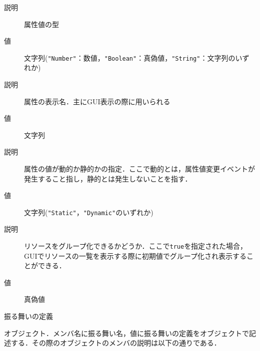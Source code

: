 \begin{description}
\begin{description}
            \begin{description}
            \setlength{\itemsep}{-1.5\itemsep}
            {\nopagebreak
            \item[\texttt{VariableType}] \mbox{}
            \vspace{-0.25zw}
                \begin{description}
                \item[説明] 属性値の型
                \item[値] 文字列(\verb|"Number"|：数値，\verb|"Boolean"|：真偽値，\verb|"String"|：文字列のいずれか)
                \end{description}
            }{\nopagebreak
            \item[\texttt{DisplayName}] \mbox{}
            \vspace{-0.25zw}
                \begin{description}
                \item[説明] 属性の表示名．主にGUI表示の際に用いられる
                \item[値] 文字列
                \end{description}
            }{\nopagebreak
            \item[\texttt{AllocationType}] \mbox{}
            \vspace{-0.25zw}
                \begin{description}
                \item[説明] 属性の値が動的か静的かの指定．ここで動的とは，属性値変更イベントが発生すること指し，静的とは発生しないことを指す．
                \item[値] 文字列(\verb|"Static"|，\verb|"Dynamic"|のいずれか)
                \end{description}
            }{\nopagebreak
            \item[\texttt{CanGrouping}] \mbox{}
            \vspace{-0.25zw}
                \begin{description}
                \item[説明] リソースをグループ化できるかどうか．ここで\verb|true|を指定された場合，GUIでリソースの一覧を表示する際に初期値でグループ化され表示することができる．
                \item[値] 真偽値
                \end{description}
            }
            \end{description}
    \end{description}
\item[\texttt{Behaviors}] \mbox{}
    \vspace{-1zw}
    \begin{description}
    \setlength{\itemsep}{-1.5\itemsep}
    \item[説明] 振る舞いの定義
    \item[値] オブジェクト．メンバ名に振る舞い名，値に振る舞いの定義をオブジェクトで記述する．その際のオブジェクトのメンバの説明は以下の通りである．
    

\end{description}
\end{description}
